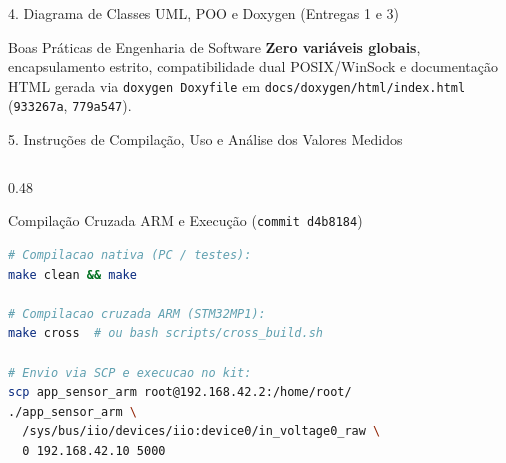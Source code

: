 \documentclass[aspectratio=169,10pt]{beamer}
\begin{document}
\begin{frame}[fragile]{4. Diagrama de Classes UML, POO e Doxygen (Entregas 1 e 3)}
  \vspace{0.08cm}
  \begin{alertblock}{Boas Pr\'{a}ticas de Engenharia de Software}
    \scriptsize
    \textbf{Zero vari\'{a}veis globais}, encapsulamento estrito, compatibilidade dual POSIX/WinSock e documenta\c{c}\~{a}o HTML gerada via \texttt{doxygen Doxyfile} em \texttt{docs/doxygen/html/index.html} (\texttt{933267a}, \texttt{779a547}).
  \end{alertblock}
\end{frame}

\begin{frame}[fragile]{5. Instru\c{c}\~{o}es de Compila\c{c}\~{a}o, Uso e An\'{a}lise dos Valores Medidos}
  \begin{columns}[T,onlytextwidth]
    \begin{column}{0.48\textwidth}
      \begin{block}{Compila\c{c}\~{a}o Cruzada ARM e Execu\c{c}\~{a}o (\texttt{commit d4b8184})}
\begin{lstlisting}[language=bash]
# Compilacao nativa (PC / testes):
make clean && make

# Compilacao cruzada ARM (STM32MP1):
make cross  # ou bash scripts/cross_build.sh

# Envio via SCP e execucao no kit:
scp app_sensor_arm root@192.168.42.2:/home/root/
./app_sensor_arm \
  /sys/bus/iio/devices/iio:device0/in_voltage0_raw \
  0 192.168.42.10 5000
\end{lstlisting}
      \end{block}
    \end{column}


\end{columns}
\end{frame}
\end{document}
